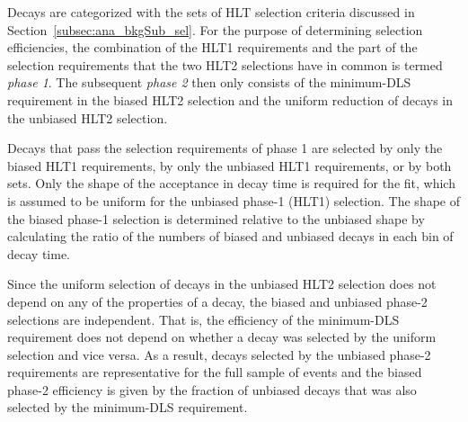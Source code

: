 Decays are categorized with the sets of HLT selection criteria discussed in Section~\ref{subsec:ana_bkgSub_sel}. For the purpose of
determining selection efficiencies, the combination of the HLT1 requirements and the part of the selection requirements that the two HLT2
selections have in common is termed \emph{phase 1}. The subsequent \emph{phase 2} then only consists of the minimum-DLS requirement in the
biased HLT2 selection and the uniform reduction of decays in the unbiased HLT2 selection.

Decays that pass the selection requirements of phase 1 are selected by only the biased HLT1 requirements, by only the unbiased HLT1
requirements, or by both sets. Only the shape of the acceptance in decay time is required for the fit, which is assumed to be uniform for
the unbiased phase-1 (HLT1) selection. The shape of the biased phase-1 selection is determined relative to the unbiased shape by
calculating the ratio of the numbers of biased and unbiased decays in each bin of decay time.

Since the uniform selection of decays in the unbiased HLT2 selection does not depend on any of the properties of a decay, the biased and
unbiased phase-2 selections are independent. That is, the efficiency of the minimum-DLS requirement does not depend on whether a decay was
selected by the uniform selection and vice versa. As a result, decays selected by the unbiased phase-2 requirements are representative for
the full sample of events and the biased phase-2 efficiency is given by the fraction of unbiased decays that was also selected by the
minimum-DLS requirement.

